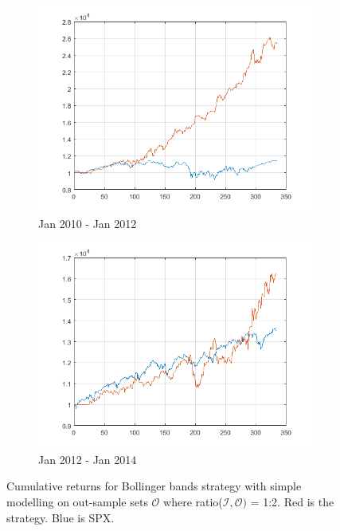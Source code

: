 \documentclass[11pt,a4,twosided,singlespacing,titlepagenumber=on]{scrreprt}
\numberwithin{equation}{chapter} %
\theoremstyle{remark}
\begin{document}
\begin{figure}[H]
\begin{subfigure}[t]{0.32\textwidth}
        \includegraphics[width=1\textwidth]{res/backtest/11}
        \caption{Jan 2010 - Jan 2012}
    \end{subfigure}
    \begin{subfigure}[t]{0.32\textwidth}
        \centering
        \includegraphics[width=1\textwidth]{res/backtest/12}
        \caption{Jan 2012 - Jan 2014}
    \end{subfigure}
    \caption{Cumulative returns for Bollinger bands strategy with simple modelling on out-sample sets $\mathcal{O}$ where ratio($\mathcal{I}, \mathcal{O})$ = 1:2. Red is the strategy. Blue is SPX.}
    \label{fig:bollinger_bands_strategy_simple}
\end{figure}
\end{document}
